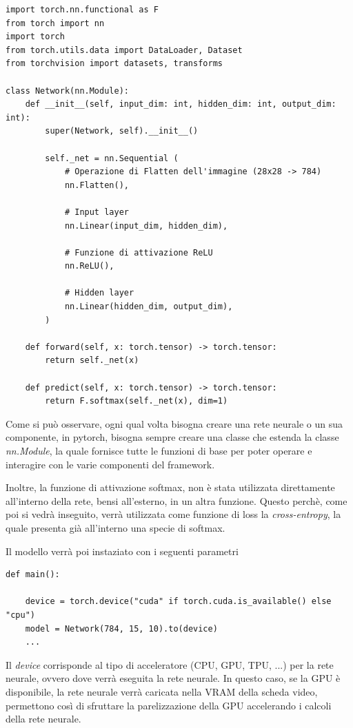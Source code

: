 \begin{lstlisting}
import torch.nn.functional as F
from torch import nn
import torch
from torch.utils.data import DataLoader, Dataset
from torchvision import datasets, transforms

class Network(nn.Module):
    def __init__(self, input_dim: int, hidden_dim: int, output_dim: int):
        super(Network, self).__init__()
        
        self._net = nn.Sequential (
            # Operazione di Flatten dell'immagine (28x28 -> 784)
            nn.Flatten(),                      
            
            # Input layer
            nn.Linear(input_dim, hidden_dim),  

            # Funzione di attivazione ReLU
            nn.ReLU(), 
            
            # Hidden layer
            nn.Linear(hidden_dim, output_dim), 
        )
        
    def forward(self, x: torch.tensor) -> torch.tensor:
        return self._net(x)
    
    def predict(self, x: torch.tensor) -> torch.tensor:
        return F.softmax(self._net(x), dim=1)

\end{lstlisting}

Come si può osservare, ogni qual volta bisogna creare una rete neurale o 
un sua componente, in pytorch, bisogna sempre creare una classe che 
estenda la classe \textit{nn.Module}, la quale fornisce tutte le funzioni di 
base per poter operare e interagire con le varie componenti del framework.
 
Inoltre, la funzione di attivazione softmax, non è stata utilizzata 
direttamente all'interno della rete, bensi all'esterno, in un altra funzione. Questo perchè, come poi si vedrà inseguito, verrà utilizzata 
come funzione di loss la \textit{cross-entropy}, la quale presenta già 
all'interno una specie di softmax. 

Il modello verrà poi instaziato con i seguenti parametri

\begin{lstlisting}
def main():

    device = torch.device("cuda" if torch.cuda.is_available() else "cpu")
    model = Network(784, 15, 10).to(device)
    ...
\end{lstlisting}

Il \textit{device} corrisponde al tipo di acceleratore (CPU, GPU, TPU, ...) 
per la rete neurale, ovvero dove verrà eseguita la rete neurale.
In questo caso, se la GPU è disponibile, la rete neurale verrà caricata nella 
VRAM della scheda video, permettono così di sfruttare la parelizzazione della
GPU accelerando i calcoli della rete neurale. 

